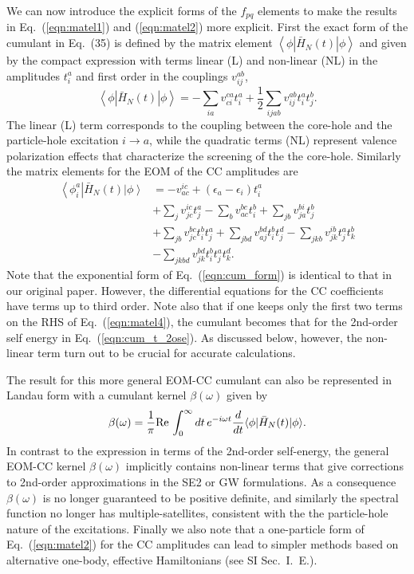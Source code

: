 \documentclass[aps,prb,twocolumn,groupaddress,floatfix]{revtex4}
\begin{document}
We can now
introduce the explicit forms of the $f_{pq}$ elements to make the results in
Eq.\ (\ref{eqn:matel1}) and (\ref{eqn:matel2}) more explicit.
First the exact form of the cumulant in Eq.\ (35) is defined by the matrix
element $\left< \phi \left| \bar{H}_N(t) \right| \phi \right>$ and
given by the compact expression with terms
linear (L) and non-linear (NL) in the amplitudes $t_i^a$ and 
first order in the couplings $v_{ij}^{ab}$,
\begin{equation}
\label{eqn:matel3}
\left< \phi \left| \bar{H}_N(t) \right| \phi \right> =
-\sum_{ia} v_{ci}^{ca} t_i^a +
\frac{1}{2} \sum_{ijab} v_{ij}^{ab} t_i^a t_j^b.
\end{equation}
The linear (L) term corresponds to the coupling between the core-hole and the
particle-hole excitation $i \rightarrow a$, while the quadratic terms (NL) represent valence polarization effects that characterize the screening of the
the core-hole.
Similarly the matrix elements for the EOM of the CC amplitudes are
\begin{equation}
\label{eqn:matel4}
\begin{split}
\left< \phi_{i}^{a} \right| \bar{H}_N(t) \left| \phi \right> 
&= -v_{ac}^{ic} + \left( \epsilon_a - \epsilon_i \right) t_i^a \\
&+ \sum_{j} v_{jc}^{ic} t_j^a - \sum_{b} v_{ac}^{bc} t_i^b
+ \sum_{jb} v_{ja}^{bi} t_j^b \\
&+ \sum_{jb} v_{jc}^{bc} t_i^b t_j^a + \sum_{jbd} v_{aj}^{bd} t_i^b t_j^d
- \sum_{jkb} v_{jk}^{ib} t_j^a t_k^b \\
&- \sum_{jkbd} v_{jk}^{bd} t_i^b t_j^a t_k^d.
\end{split}
\end{equation}
Note that the exponential form of Eq.\ (\ref{eqn:cum_form})
is identical to that in our original paper.\cite{RVKNKP}
However,
the differential
equations for the CC coefficients have terms up to third order.
Note also that if one keeps only the first two terms on the RHS of
Eq.\ (\ref{eqn:matel4}),
the cumulant becomes that for the 2nd-order self energy
in Eq.\ (\ref{eqn:cum_t_2ose}). As discussed below, however, the non-linear term turn out to be crucial for accurate calculations.

The result for this more general EOM-CC cumulant can also be represented in
Landau form with a cumulant kernel $\beta(\omega)$ given by 
\begin{equation}
\label{eq:beta}
\beta(\omega) =\frac{1}{\pi}{\rm Re}\, \int_0^{\infty} dt\, e^{-i\omega t}
\frac{d}{dt}\langle\phi|\bar{H}_N(t)|\phi\rangle.
\end{equation}
In contrast to the expression in terms of the 2nd-order self-energy,
the general
EOM-CC kernel $\beta(\omega)$ implicitly contains non-linear terms that
give corrections to 2nd-order approximations in the SE2 or GW formulations.
As a consequence $\beta(\omega)$ is no longer guaranteed to be positive
definite, and similarly the spectral function no longer has
multiple-satellites, consistent with the the particle-hole nature of the
excitations.\cite{marilena20}
Finally we also note that a one-particle form of Eq.\ (\ref{eqn:matel2}) for the CC amplitudes can lead to simpler methods based on alternative one-body, effective Hamiltonians (see SI Sec.\ I.\ E.).
\end{document}
